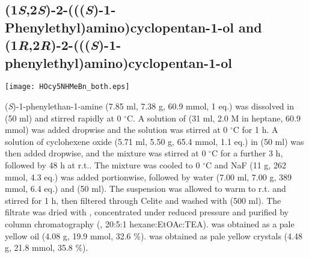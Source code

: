 \subsection{(1\textit{S},2\textit{S})\hyp{}2\hyp{}(((\textit{S})\hyp{}1\hyp{}Phenylethyl)amino)cyclopentan\hyp{}1\hyp{}ol  and (1\textit{R},2\textit{R})\hyp{}2\hyp{}(((\textit{S})\hyp{}1\hyp{}phenylethyl)amino)cyclopentan\hyp{}1\hyp{}ol }


\begin{scheme}[H]
	\begin{center}
		\texttt{[image: HOcy5NHMeBn\_both.eps]}
	\end{center}
\end{scheme}
(\textit{S})-1-phenylethan-1-amine  (7.85 ml, 7.38 g, 60.9 mmol, 1 eq.) was dissolved in  (50 ml) and stirred rapidly at 0 $^\circ$C. A solution of  (31 ml, 2.0 M in heptane, 60.9 mmol) was added dropwise and the solution was stirred at 0 $^\circ$C for 1 h. A solution of cyclohexene oxide  (5.71 ml, 5.50 g, 65.4 mmol, 1.1 eq.) in  (50 ml) was then added dropwise, and the mixture was stirred at 0 $^\circ$C for a further 3 h, followed by 48 h at r.t.. The mixture was cooled  to 0 $^\circ$C and NaF (11 g, 262 mmol, 4.3 eq.) was added portionwise, followed by water (7.00 ml, 7.00 g, 389 mmol, 6.4 eq.) and  (50 ml). The suspension was allowed to warm to r.t. and stirred for 1 h, then filtered through Celite and washed with  (500 ml). The filtrate was dried with , concentrated under reduced pressure and purified by column chromatography (, 20:5:1 hexane:EtOAc:TEA).  was obtained as a pale yellow oil (4.08 g, 19.9 mmol, 32.6 \%).  was obtained as pale yellow crystals (4.48 g, 21.8 mmol, 35.8 \%).

